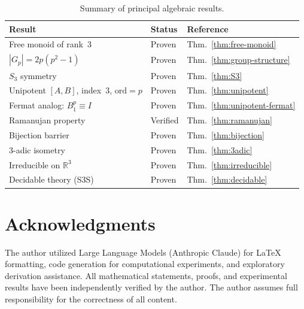 \documentclass[12pt]{amsart}
\theoremstyle{definition}
\theoremstyle{remark}
\begin{document}
\begin{table}[htbp]
\centering
\caption{Summary of principal algebraic results.}\label{tab:summary}
\begin{tabular}{@{}lll@{}}
\toprule
Result & Status & Reference \\
\midrule
Free monoid of rank~3 & Proven & Thm.~\ref{thm:free-monoid} \\
$|G_p| = 2p(p^2-1)$ & Proven & Thm.~\ref{thm:group-structure} \\
$S_3$ symmetry & Proven & Thm.~\ref{thm:S3} \\
Unipotent $[A,B]$, index~3, $\mathrm{ord} = p$ & Proven & Thm.~\ref{thm:unipotent} \\
Fermat analog: $B_1^p \equiv I$ & Proven & Thm.~\ref{thm:unipotent-fermat} \\
Ramanujan property & Verified & Thm.~\ref{thm:ramanujan} \\
Bijection barrier & Proven & Thm.~\ref{thm:bijection} \\
$3$-adic isometry & Proven & Thm.~\ref{thm:3adic} \\
Irreducible on $\mathbb{R}^3$ & Proven & Thm.~\ref{thm:irreducible} \\
Decidable theory (S3S) & Proven & Thm.~\ref{thm:decidable} \\
\bottomrule
\end{tabular}
\end{table}


\section*{Acknowledgments}
The author utilized Large Language Models (Anthropic Claude) for \LaTeX{}
formatting, code generation for computational experiments, and exploratory
derivation assistance. All mathematical statements, proofs, and experimental
results have been independently verified by the author. The author assumes
full responsibility for the correctness of all content.

\end{document}

